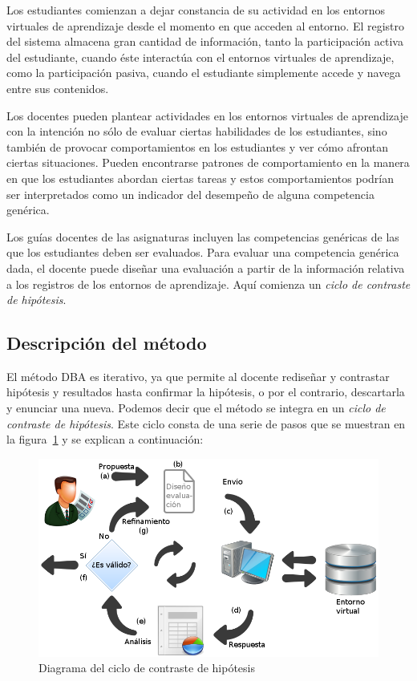 Los estudiantes comienzan a dejar constancia de su actividad en los entornos virtuales de aprendizaje desde el momento en que acceden al entorno. El registro del sistema almacena gran cantidad de información, tanto la participación activa del estudiante, cuando éste interactúa con el entornos virtuales de aprendizaje, como la participación pasiva, cuando el estudiante simplemente accede y navega entre sus contenidos. 

Los docentes pueden plantear actividades en los entornos virtuales de aprendizaje con la intención no sólo de evaluar ciertas habilidades de los estudiantes, sino también de provocar comportamientos en los estudiantes y ver cómo afrontan ciertas situaciones. Pueden encontrarse patrones de comportamiento en la manera en que los estudiantes abordan ciertas tareas y estos comportamientos podrían ser interpretados como un indicador del desempeño de alguna competencia genérica.

Los guías docentes de las asignaturas incluyen las competencias genéricas de las que los estudiantes deben ser evaluados. Para evaluar una competencia genérica dada, el docente puede diseñar una evaluación a partir de la información relativa a los registros de los entornos de aprendizaje. Aquí comienza un \emph{ciclo de contraste de hipótesis}. 

\subsection{Descripción del método}

El método DBA es iterativo, ya que permite al docente rediseñar y contrastar hipótesis y resultados hasta confirmar la hipótesis, o por el contrario, descartarla y enunciar una nueva. Podemos decir que el método se integra en un \emph{ciclo de contraste de hipótesis}. Este ciclo consta de una serie de pasos que se muestran en la figura~\ref{fig:CCHDiagram} y se explican a continuación:

\begin{figure}
  \begin{center}
    \includegraphics[scale=0.45]{CCHDiagram.png}
  \end{center}
  \caption{Diagrama del ciclo de contraste de hipótesis}
  \label{fig:CCHDiagram}
\end{figure}

